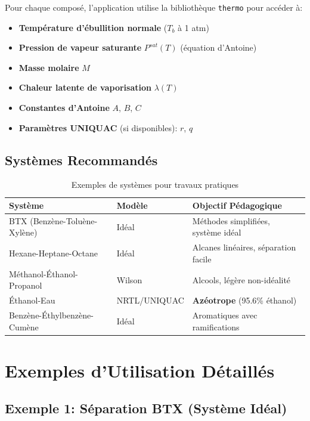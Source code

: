\documentclass[11pt,a4paper]{article}
\begin{document}
Pour chaque composé, l'application utilise la bibliothèque \texttt{thermo} pour accéder à:

\begin{itemize}[leftmargin=*]
    \item \textbf{Température d'ébullition normale} ($T_b$ à 1 atm)
    \item \textbf{Pression de vapeur saturante} $P^{sat}(T)$ (équation d'Antoine)
    \item \textbf{Masse molaire} $M$
    \item \textbf{Chaleur latente de vaporisation} $\lambda(T)$
    \item \textbf{Constantes d'Antoine} $A$, $B$, $C$
    \item \textbf{Paramètres UNIQUAC} (si disponibles): $r$, $q$
\end{itemize}

\subsection{Systèmes Recommandés}

\begin{table}[h]
\centering
\small
\begin{tabular}{llp{7cm}}
\toprule
\textbf{Système} & \textbf{Modèle} & \textbf{Objectif Pédagogique} \\
\midrule
BTX (Benzène-Toluène-Xylène) & Idéal & Méthodes simplifiées, système idéal \\
Hexane-Heptane-Octane & Idéal & Alcanes linéaires, séparation facile \\
Méthanol-Éthanol-Propanol & Wilson & Alcools, légère non-idéalité \\
Éthanol-Eau & NRTL/UNIQUAC & \textbf{Azéotrope} (95.6\% éthanol) \\
Benzène-Éthylbenzène-Cumène & Idéal & Aromatiques avec ramifications \\
\bottomrule
\end{tabular}
\caption{Exemples de systèmes pour travaux pratiques}
\end{table}

\section{Exemples d'Utilisation Détaillés}

\subsection{Exemple 1: Séparation BTX (Système Idéal)}
\end{document}
